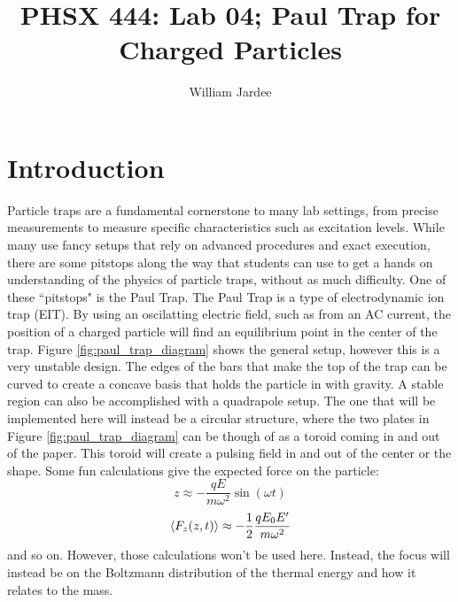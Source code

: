 \documentclass[12pt]{article}
\begin{document}
\title{PHSX 444: Lab 04; Paul Trap for Charged Particles}
\author{William Jardee}
\maketitle


\section{Introduction}

Particle traps are a fundamental cornerstone to many lab settings, from precise measurements to measure specific characteristics such as excitation levels. While many use fancy setups that rely on advanced procedures and exact execution, there are some pitstops along the way that students can use to get a hands on understanding of the physics of particle traps, without as much difficulty. One of these ``pitstops" is the Paul Trap. The Paul Trap is a type of electrodynamic ion trap (EIT). By using an oscilatting electric field, such as from an AC current, the position of a charged particle will find an equilibrium point in the center of the trap. Figure \ref{fig:paul_trap_diagram} shows the general setup, however this is a very unstable design. The edges of the bars that make the top of the trap can be curved to create a concave basis that holds the particle in with gravity. A stable region can also be accomplished with a quadrapole setup. The one that will be implemented here will instead be a circular structure, where the two plates in Figure \ref{fig:paul_trap_diagram} can be though of as a toroid coming in and out of the paper. This toroid will create a pulsing field in and out of the center or the shape. Some fun calculations give the expected force on the particle:
\begin{equation*}
z \approx -\frac{q E}{m \omega^2}\sin(\omega t)
\end{equation*}
\begin{equation*}
\ev{F_z(z,t)} \approx -\frac{1}{2} \frac{qE_0 E^\prime}{m \omega^2}
\end{equation*}
and so on. However, those calculations won't be used here. Instead, the focus will instead be on the Boltzmann distribution of the thermal energy and how it relates to the mass. 
\end{document}
